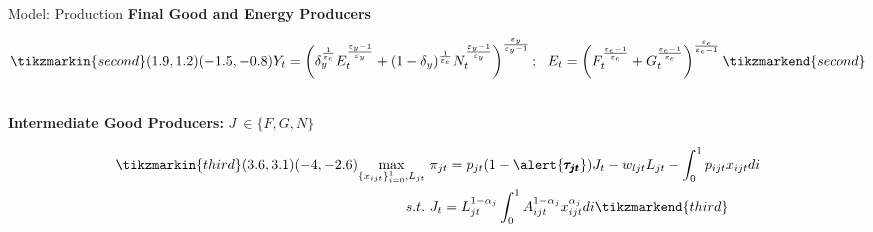 \documentclass[11pt,aspectratio=169]{beamer}
\begin{document}
\begin{frame}{Model: Production}
\textbf{Final Good and Energy Producers }
\vspace{-5mm}
	\begin{minipage}[t!]{1\textwidth}
		\begin{align*}
		\tikzmarkin{second}(1.9,1.2)(-1.5,-0.8)
Y_t=\left(\delta_y^{\frac{1}{\varepsilon_e}}E_t^\frac{\varepsilon_y-1}{\varepsilon_y}+(1-\delta_y)^{\frac{1}{\varepsilon_e}}N_t^\frac{\varepsilon_y-1}{\varepsilon_y}\right)^\frac{\varepsilon_y}{\varepsilon_y-1}; \ \ 
E_t=\left({F}_t^\frac{\varepsilon_e-1}{\varepsilon_e}+G_t^\frac{\varepsilon_e-1}{\varepsilon_e}\right)^\frac{\varepsilon_e}{\varepsilon_e-1}
\tikzmarkend{second}
\end{align*}
	\end{minipage}
\\

\vspace{12mm}
\textbf{Intermediate Good Producers:} $J\ \in\{F,G,N\}$
	\vspace{-3mm}
\begin{minipage}[t!]{1\textwidth}
	\begin{align*}
	\tikzmarkin{third}(3.6,3.1)(-4,-2.6)
\underset{\{x_{ijt}\}_{i=0}^1, L_{jt}}{\max}\ & \pi_{jt}=p_{jt}(1-\alert{\pmb{\tau_{jt}}})J_t-w_{ljt}L_{jt}-\int_{0}^{1}p_{ijt}x_{ijt}di\\ 
 s.t.\ & J_{t}=L_{jt}^{1-\alpha_j}\int_{0}^{1}A^{1-\alpha_j}_{ijt}x_{ijt}^{\alpha_j}di 
	\tikzmarkend{third}
	\end{align*}
\end{minipage}
\end{frame}
\end{document}
